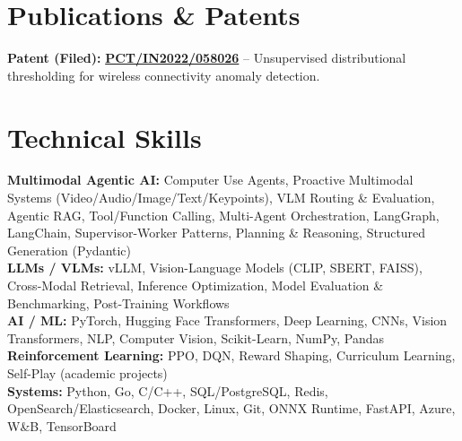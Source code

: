 \documentclass[letterpaper,11pt]{article}
\begin{document}
\section{Publications \& Patents}
\resumeSubHeadingListStart
\resumeProjectHeading
{\textbf{Patent (Filed):} \href{https://patents.justia.com/inventor/vedaang-chopra}{\textbf{PCT/IN2022/058026}} -- Unsupervised distributional thresholding for wireless connectivity anomaly detection.}{}
\resumeSubHeadingListEnd

\section{Technical Skills}
\footnotesize
\textbf{Multimodal Agentic AI:} Computer Use Agents, Proactive Multimodal Systems (Video/Audio/Image/Text/Keypoints), VLM Routing \& Evaluation, Agentic RAG, Tool/Function Calling, Multi-Agent Orchestration, LangGraph, LangChain, Supervisor-Worker Patterns, Planning \& Reasoning, Structured Generation (Pydantic) \\[1pt]
\textbf{LLMs / VLMs:} vLLM, Vision-Language Models (CLIP, SBERT, FAISS), Cross-Modal Retrieval, Inference Optimization, Model Evaluation \& Benchmarking, Post-Training Workflows \\[1pt]
\textbf{AI / ML:} PyTorch, Hugging Face Transformers, Deep Learning, CNNs, Vision Transformers, NLP, Computer Vision, Scikit-Learn, NumPy, Pandas \\[1pt]
\textbf{Reinforcement Learning:} PPO, DQN, Reward Shaping, Curriculum Learning, Self-Play (academic projects) \\[1pt]
\textbf{Systems:} Python, Go, C/C++, SQL/PostgreSQL, Redis, OpenSearch/Elasticsearch, Docker, Linux, Git, ONNX Runtime, FastAPI, Azure, W\&B, TensorBoard
\end{document}
